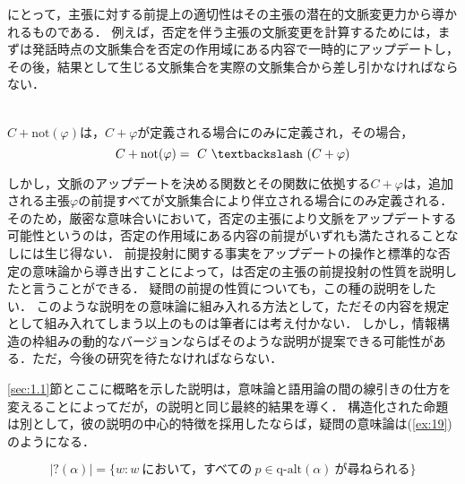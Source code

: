 \documentclass{goken}
\newcommand{\ori}[1]{\noindent\textcolor[gray]{0.7}{\fontsize{8pt}{8pt}\selectfont{\textsf{(p.~#1)}}} }
\begin{document}
\citet{Heim1982,Heim1983,Heim1992}にとって，主張に対する前提上の適切性はその主張の潜在的文脈変更力から導かれるものである．
例えば，否定を伴う主張の文脈変更を計算するためには，まずは発話時点の文脈集合を否定の作用域にある内容で一時的にアップデートし，その後，結果として生じる文脈集合を実際の文脈集合から差し引かなければならない．

\ori{24}
 \begin{exe}
	\label{ex:18}\\
	$C + \text{not}(\varphi)$は，$C + \varphi$が定義される場合にのみに定義され，その場合，
	\[
	C + \text{not}(\varphi) =\ C\ \textbackslash\ (C + \varphi)
	\]
 \end{exe}

\noindent
しかし，文脈のアップデートを決める関数とその関数に依拠する$C + \varphi$は，追加される主張$\varphi$の前提すべてが文脈集合により伴立される場合にのみ定義される．
そのため，厳密な意味合いにおいて，否定の主張により文脈をアップデートする可能性というのは，否定の作用域にある内容の前提がいずれも満たされることなしには生じ得ない．
前提投射に関する事実をアップデートの操作と標準的な否定の意味論から導き出すことによって，\citeauthor{Heim1992}は否定の主張の前提投射の性質を説明したと言うことができる．
疑問の前提の性質についても，この種の説明をしたい．
このような説明を\citet{vonStechow1991}の意味論に組み入れる方法として，ただその内容を規定として組み入れてしまう以上のものは筆者には考え付かない．
しかし，情報構造の枠組みの動的なバージョンならばそのような説明が提案できる可能性がある．ただ，今後の研究を待たなければならない．

\ref{sec:1.1}節とここに概略を示した説明は，意味論と語用論の間の線引きの仕方を変えることによってだが，\citeauthor{vonStechow1991}の説明と同じ最終的結果を導く．
構造化された命題は別として，彼の説明の中心的特徴を採用したならば，疑問の意味論は(\ref{ex:19})のようになる．

\begin{exe}
	\label{ex:19}
	\[
	|?(\alpha)| = \{w: w\ \text{において，すべての}\ p \in \text{q-alt}(\alpha)\ \text{が尋ねられる}\}
	\]
\end{exe}
\end{document}
